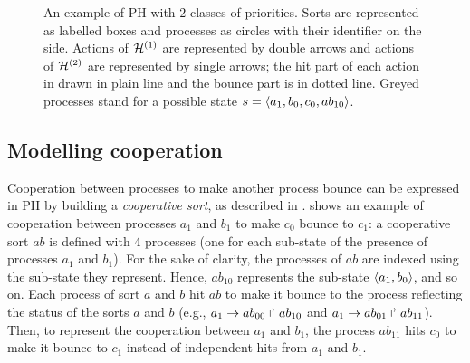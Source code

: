 \begin{example}
\begin{figure}[p]
{
  }
  \caption{
  \label{fig:ph-livelock}
    An example of PH with $2$ classes of priorities.
    Sorts are represented as labelled boxes and processes as circles with their identifier on the side.
    Actions of $\mathcal{H}^{(1)}$ are represented by double arrows and actions of $\mathcal{H}^{(2)}$ are represented by single arrows;
    the hit part of each action in drawn in plain line and the bounce part is in dotted line.
    Greyed processes stand for a possible state $s = \mbox{$\langle a_1, b_0, c_0, ab_{10} \rangle$}$.
  }
\end{figure}

\end{example}



\subsection{Modelling cooperation}
\label{ssec:cooperation}

Cooperation between processes to make another process bounce can be expressed in PH by building a \emph{cooperative sort}, as described in \cite{PMR10-TCSB}.
 shows an example of cooperation between processes $a_1$ and $b_1$ to make $c_0$ bounce to $c_1$:
a cooperative sort $ab$ is defined with 4 processes (one for each sub-state of the presence of processes $a_1$ and $b_1$).
For the sake of clarity, the processes of $ab$ are indexed using the sub-state they represent.
Hence, $ab_{10}$ represents the sub-state $\mbox{$\langle a_1,b_0 \rangle$}$, and so on.
Each process of sort $a$ and $b$ hit $ab$ to make it bounce to the process reflecting the status of the sorts $a$ and $b$
(e.g., $a_1\rightarrow ab_{00}\Rsh ab_{10}$ and $a_1\rightarrow ab_{01}\Rsh ab_{11}$).
Then, to represent the cooperation between $a_1$ and $b_1$, the process $ab_{11}$ hits $c_0$ to make it bounce to $c_1$ instead of independent hits from $a_1$ and $b_1$.

